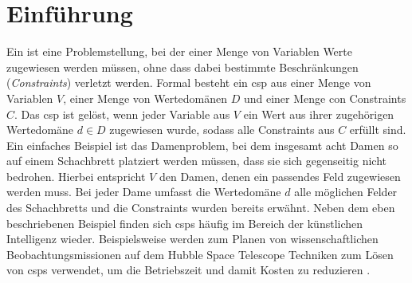 \section{Einführung}
Ein  ist eine Problemstellung, bei der einer Menge von Variablen Werte zugewiesen werden müssen, ohne dass dabei bestimmte Beschränkungen (\textit{Constraints}) 
verletzt werden. Formal besteht ein \ac*{csp} aus einer Menge von Variablen $V$, einer Menge von Wertedomänen $D$ und einer Menge con Constraints $C$. Das \ac*{csp} ist gelöst,
wenn jeder Variable aus $V$ ein Wert aus ihrer zugehörigen Wertedomäne $d \in D$ zugewiesen wurde, sodass alle Constraints aus $C$ erfüllt sind. Ein einfaches Beispiel ist das
Damenproblem, bei dem insgesamt acht Damen so auf einem Schachbrett platziert werden müssen, dass sie sich gegenseitig nicht bedrohen. Hierbei entspricht $V$ den Damen, denen
ein passendes Feld zugewiesen werden muss. Bei jeder Dame umfasst die Wertedomäne $d$ alle möglichen Felder des Schachbretts und die Constraints wurden bereits erwähnt. Neben
dem eben beschriebenen Beispiel finden sich \acp{csp} häufig im Bereich der künstlichen Intelligenz wieder. Beispielsweise werden zum Planen von wissenschaftlichen
Beobachtungsmissionen auf dem Hubble Space Telescope Techniken zum Lösen von \acp{csp} verwendet, um die Betriebszeit und damit Kosten zu reduzieren \cite{HubbleScheduling}.
